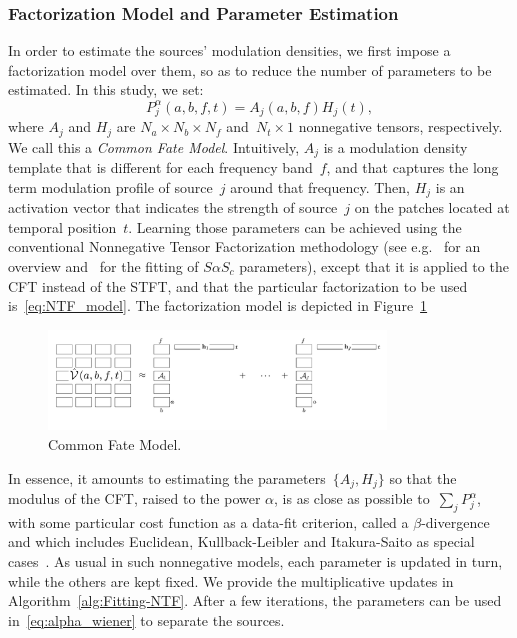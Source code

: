 \subsubsection{Factorization Model and Parameter Estimation}
\label{sub:NTF}

In order to estimate the sources' modulation densities, we first impose
a factorization model over them, so as to reduce the number of parameters
to be estimated. In this study, we set:
\begin{equation}
P_{j}^{\alpha}\left(a,b,f,t\right)=A_{j}\left(a,b,f\right)H_{j}\left(t\right),\label{eq:NTF_model}
\end{equation}
where $A_{j}$ and $H_{j}$ are $N_{a}\times N_{b}\times N_{f}$ and~$N_{t}\times1$
nonnegative tensors, respectively. We call this a \emph{Common Fate
Model}. Intuitively, $A_{j}$ is a modulation density template that
is different for each frequency band~$f$, and that captures the
long term modulation profile of source~$j$ around that frequency.
Then, $H_{j}$ is an activation vector that indicates the strength
of source~$j$ on the patches located at temporal position~$t$.
Learning those parameters can be achieved using the conventional Nonnegative
Tensor Factorization methodology (see e.g.~\cite{cichoki09,ozerov12,smaragdis14}
for an overview and~\cite{liutkus15b} for the fitting of $S\alpha S_{c}$
parameters), except that it is applied to the CFT instead of the STFT,
and that the particular factorization to be used is~\eqref{eq:NTF_model}.
The factorization model is depicted in Figure~\ref{fig:cfm}

\begin{figure}[h]
\centering
\includegraphics[width=0.8\textwidth]{Chapters/06_Separation_Unknown/figures/cfm.pdf}

\caption{Common Fate Model.}
\label{fig:cfm}
\end{figure}

In essence, it amounts to estimating the parameters~$\{ A_{j},H_{j}\} $
so that the modulus of the CFT, raised to the power $\alpha$, is
as close as possible to~$\sum_{j}P_{j}^{\alpha}$, with some particular
cost function as a data-fit criterion, called a $\beta$-divergence
and which includes Euclidean, Kullback-Leibler and Itakura-Saito as
special cases~\cite{fitzgerald08a}. As usual in such nonnegative models,
each parameter is updated in turn, while the others are kept fixed.
We provide the multiplicative updates in Algorithm~\ref{alg:Fitting-NTF}.
After a few iterations, the parameters can be used in~\eqref{eq:alpha_wiener} to separate
the sources.

